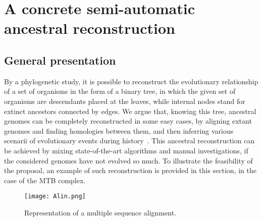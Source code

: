 \documentclass[runningheads,a4paper]{llncs}
\begin{document}
\section{A concrete semi-automatic ancestral reconstruction}
\label{phylogenetic analysis}


\subsection{General presentation}
\label{Problem review}
By a phylogenetic study, it is possible to reconstruct the evolutionary relationship of a set of organisms in the form of a binary tree, in which the given set of organisms are descendants placed at the leaves, while internal nodes stand for extinct ancestors connected by edges. We argue that, knowing this tree, ancestral genomes can be completely reconstructed in some easy cases, by aligning extant genomes and finding homologies between them, and then inferring various scenarii of evolutionary events during history~\cite{yang2011analysis}. This ancestral reconstruction can be achieved by mixing state-of-the-art algorithms and manual investigations, if the considered genomes have not evolved so much. To illustrate the feasibility of the proposal, an example of such reconstruction is provided in this section, in the case of the MTB complex.


\begin{figure}
\centering
\texttt{[image: Alin.png]}
\caption{Representation of a multiple sequence alignment.} 
\label{fig:Align}
\end{figure}
\end{document}
